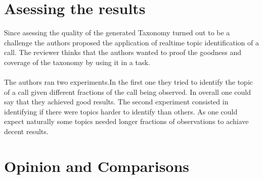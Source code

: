 \documentclass[4pt,a4paper,twocolumn]{article}
\begin{document}
\section{Asessing the results}
Since asessing the quality of the generated Taxonomy turned out to be a challenge the
authors proposed the application of realtime topic identification of a call.
The reviewer thinks that the authors wanted to proof the goodness and coverage of the 
taxonomy by using it in a task.\\
\\
The authors ran two experiments.In the first one they tried to identify the topic of a call
given different fractions of the call being observed. In overall one could say that they achieved
good results.
The second experiment consisted in identifying if there were topics harder to identify than others.
As one could expect naturally some topics needed longer fractions of observations to achiave decent results.

\section{Opinion and Comparisons}
\end{document}
